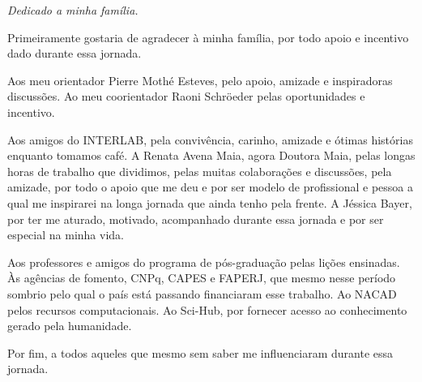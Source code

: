 \documentclass[
	12pt,				%
	openright,			%
	twoside,			%
	a4paper,			%
	chapter=TITLE,		%
	english,			%
	french,				%
	spanish,			%
	brazil				%
	]{abntex2}
\begin{document}
\begin{dedicatoria}
   \vspace*{\fill}
   \centering
   \noindent
   \textit{Dedicado a minha família.} \vspace*{\fill}
\end{dedicatoria}

\begin{agradecimentos}
	Primeiramente gostaria de agradecer à minha família, por todo apoio e incentivo dado durante essa jornada. 
	
	
	Aos meu orientador Pierre Mothé Esteves, pelo apoio, amizade e inspiradoras discussões. Ao meu coorientador Raoni Schröeder pelas oportunidades e incentivo. 
	
	Aos amigos do INTERLAB, pela convivência, carinho, amizade e ótimas histórias enquanto tomamos café. 
	A Renata Avena Maia, agora Doutora Maia, pelas longas horas de trabalho que dividimos, pelas muitas colaborações e discussões, pela amizade, por todo o apoio que me deu e por ser modelo de profissional e pessoa a qual me inspirarei na longa jornada que ainda tenho pela frente.
	A Jéssica Bayer, por ter me aturado, motivado, acompanhado durante essa jornada e por ser especial na minha vida. 
	
	Aos professores e amigos do programa de pós-graduação pelas lições ensinadas. Às agências de fomento, CNPq, CAPES e FAPERJ, que mesmo nesse período sombrio pelo qual o país está passando financiaram esse trabalho. Ao NACAD pelos recursos computacionais. Ao Sci-Hub, por fornecer acesso ao conhecimento gerado pela humanidade. 
	
	Por fim, a todos aqueles que mesmo sem saber me influenciaram durante essa jornada. 

\end{agradecimentos}
\end{document}
